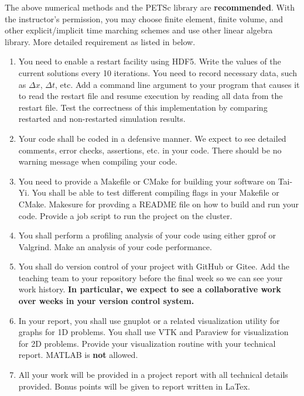 \documentclass[12pt]{article}
\begin{document}
The above numerical methods and the PETSc library are \textbf{recommended}. With the instructor's permission, you may choose finite element, finite volume, and other explicit/implicit time marching schemes and use other linear algebra library. More detailed requirement as listed in below.

\begin{enumerate}
\item You need to enable a restart facility using HDF5. Write the values of the current solutions every 10 iterations. You need to record necessary data, such as $\Delta x$, $\Delta t$, etc. Add a command line argument to your program that causes it to read the restart file and resume execution by reading all data from the restart file. Test the correctness of this implementation by comparing restarted and non-restarted simulation results.

\item Your code shall be coded in a defensive manner. We expect to see detailed comments, error checks, assertions, etc. in your code. There should be no warning message when compiling your code.

\item You need to provide a Makefile or CMake for building your software on Tai-Yi. You shall be able to test different compiling flags in your Makefile or CMake. Makesure for provding a README file on how to build and run your code. Provide a job script to run the project on the cluster.

\item You shall perform a profiling analysis of your code using either gprof or Valgrind. Make an analysis of your code performance.


\item You shall do version control of your project with GitHub or Gitee. Add the teaching team to your repository before the final week so we can see your work history. \textbf{In particular, we expect to see a collaborative work over weeks in your version control system.}

\item In your report, you shall use gnuplot or a related visualization utility for graphs for 1D problems. You shall use VTK and Paraview for visualization for 2D problems. Provide your visualization routine with your technical report. MATLAB is \textbf{not} allowed.

\item All your work will be provided in a project report with all technical details provided. Bonus points will be given to report written in LaTex.
\end{enumerate}
\end{document}
